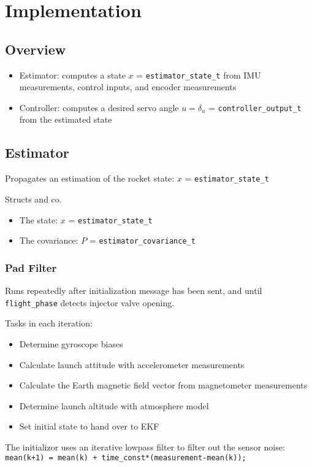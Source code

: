 \section{Implementation}
\subsection{Overview}
\begin{itemize}
    \item Estimator: computes a state $x$ = \texttt{estimator\_state\_t} from IMU measurements, control inputs, and encoder measurements
    \item Controller: computes a desired servo angle $u = \delta_u$ = \texttt{controller\_output\_t} from the estimated state
\end{itemize}

\subsection{Estimator}
Propagates an estimation of the rocket state: $x$ = \texttt{estimator\_state\_t}

Structs and co.
\begin{itemize}
    \item The state: $x$ = \texttt{estimator\_state\_t}
    \item The covariance: $P$ = \texttt{estimator\_covariance\_t}
\end{itemize}

\subsubsection{Pad Filter}
Runs repeatedly after initialization message has been sent, and until \texttt{flight\_phase} detects injector valve opening.

Tasks in each iteration:
\begin{itemize}
    \item Determine gyroscope biases
    \item Calculate launch attitude with accelerometer measurements
    \item Calculate the Earth magnetic field vector from magnetometer measurements
    \item Determine launch altitude with atmosphere model
    \item Set initial state to hand over to EKF
\end{itemize}
The initializor uses an iterative lowpass filter to filter out the sensor noise: \\
\texttt{mean(k+1) = mean(k) + time\_const*(measurement-mean(k));} 

